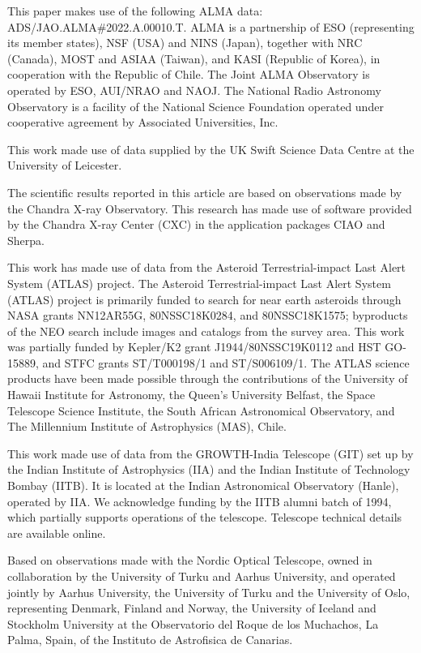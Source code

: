 \documentclass{nature_plusfigure}
\begin{document}
\begin{addendum}
This paper makes use of the following ALMA data: ADS/JAO.ALMA\#2022.A.00010.T. ALMA is a partnership of ESO (representing its member states), NSF (USA) and NINS (Japan), together with NRC (Canada), MOST and ASIAA (Taiwan), and KASI (Republic of Korea), in cooperation with the Republic of Chile. The Joint ALMA Observatory is operated by ESO, AUI/NRAO and NAOJ. The National Radio Astronomy Observatory is a facility of the National Science Foundation operated under cooperative agreement by Associated Universities, Inc.

This work made use of data supplied by the UK Swift Science Data Centre at the University of Leicester.

The scientific results reported in this article are based on observations made by the Chandra X-ray Observatory. This research has made use of software provided by the Chandra
X-ray Center (CXC) in the application packages CIAO and Sherpa.

This work has made use of data from the Asteroid Terrestrial-impact Last Alert System (ATLAS) project. The Asteroid Terrestrial-impact Last Alert System (ATLAS) project is primarily funded to search for near earth asteroids through NASA grants NN12AR55G, 80NSSC18K0284, and 80NSSC18K1575; byproducts of the NEO search include images and catalogs from the survey area. This work was partially funded by Kepler/K2 grant J1944/80NSSC19K0112 and HST GO-15889, and STFC grants ST/T000198/1 and ST/S006109/1. The ATLAS science products have been made possible through the contributions of the University of Hawaii Institute for Astronomy, the Queen’s University Belfast, the Space Telescope Science Institute, the South African Astronomical Observatory, and The Millennium Institute of Astrophysics (MAS), Chile.

This work made use of data from the GROWTH-India Telescope (GIT) set up by the Indian Institute of Astrophysics (IIA) and the Indian Institute of Technology Bombay (IITB). It is located at the Indian Astronomical Observatory (Hanle), operated by IIA. We acknowledge funding by the IITB alumni batch of 1994, which partially supports operations of the telescope. Telescope technical details are available online.\cite{growth_india}

Based on observations made with the Nordic Optical Telescope, owned in collaboration by the University of Turku and Aarhus University, and operated jointly by Aarhus University, the University of Turku and the University of Oslo, representing Denmark, Finland and Norway, the University of Iceland and Stockholm University at the Observatorio del Roque de los Muchachos, La Palma, Spain, of the Instituto de Astrofisica de Canarias.


\end{addendum}
\end{document}
